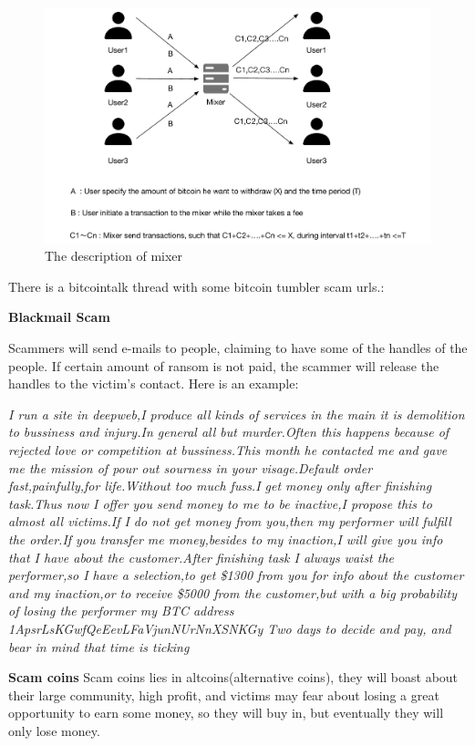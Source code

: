 \begin{figure}[tbp]
\centerline{\includegraphics[width=\columnwidth]{images/mixer.pdf}}
\caption{The description of mixer}
\label{fig:mixer}
\end{figure}

There is a bitcointalk thread with some bitcoin tumbler scam urls.\cite{tumbler-scam}:

\textbf{Blackmail Scam}

Scammers will send e-mails to people, claiming to have some of  the handles of the people. If certain amount of ransom is not paid, the scammer will release the handles to the victim's contact. Here is an example:

\textit{I run a site in deepweb,I produce all kinds of services in the main it is demolition to bussiness and injury.In general all but murder.Often this happens because of rejected love or competition at bussiness.This month he contacted me and gave me the mission of pour out sourness in your visage.Default order fast,painfully,for life.Without too much fuss.I get money only after finishing task.Thus now I offer you send money to me to be inactive,I propose this to almost all victims.If I do not get money from you,then my performer will fulfill the order.If you transfer me money,besides to my inaction,I will give you info that I have about the customer.After finishing task I always waist the performer,so I have a selection,to get \$1300 from you for info about the customer and my inaction,or to receive \$5000 from the customer,but with a big probability of losing the performer my BTC address 1ApsrLsKGwfQeEevLFaVjunNUrNnXSNKGy Two days to decide and pay, and bear in mind that time is ticking}

\textbf{Scam coins}
Scam coins lies in altcoins(alternative coins), they will boast about their large community, high profit, and victims may fear about losing a great opportunity to earn some money, so they will buy in, but eventually they will only lose money.

